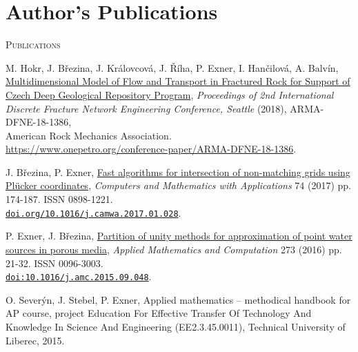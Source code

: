 \documentclass[bibliography=totocnumbered,dvipsnames,FM,Dis, EN]{tulthesis_autoreferat}
\begin{document}
\chapter{Author's Publications} \label{chap:publications}
% 
{\large\textsc{Publications}}
\begin{itemize}[label={}, leftmargin=*]

{\small
\item
M. Hokr, J. B{\v r}ezina, J. Kr{\' a}lovcov{\' a}, J. {\v R}{\' i}ha, P. Exner, I. Han{\v c}ilov{\' a}, A. Balv{\' i}n,
\href{https://www.onepetro.org/conference-paper/ARMA-DFNE-18-1386}
{Multidimensional Model of Flow and Transport in Fractured Rock for Support of Czech Deep Geological Repository Program},
\emph{Proceedings of 2nd International Discrete Fracture Network Engineering Conference, Seattle} (2018), ARMA-DFNE-18-1386, \\
American Rock Mechanics Association.\\
\url{https://www.onepetro.org/conference-paper/ARMA-DFNE-18-1386}.

\item
J. B{\v r}ezina, P. Exner, \href{http://www.sciencedirect.com/science/article/pii/S0898122117300792}{Fast algorithms for intersection of non-mat\-ching grids using Plücker coordinates},
\emph{Computers and Mathematics with Applications} 74 (2017) pp. 174-187. ISSN 0898-1221. \\
\href{https://doi.org/10.1016/j.camwa.2017.01.028}{\texttt{doi.org/10.1016/j.camwa.2017.01.028}}.

\item
P. Exner, J. B{\v r}ezina, \href{http://www.sciencedirect.com/science/article/pii/S0096300315012862}{Partition of unity methods for approximation of point water sources in porous media},
\emph{Applied Mathematics and Computation} 273 (2016) pp. 21-32. ISSN 0096-3003.\\
\href{http://dx.doi.org/10.1016/j.amc.2015.09.048}{\texttt{doi:10.1016/j.amc.2015.09.048}}.

\item
O. Sever{\' y}n, J. Stebel, P. Exner, Applied mathematics -- methodical handbook for AP course,
project Education For Effective Transfer Of Technology And Knowledge In Science And Engineering (EE2.3.45.0011),
Technical University of Liberec, 2015.

}
\end{itemize}
\end{document}
